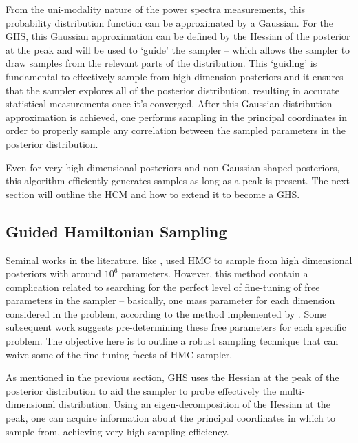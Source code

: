 \qquad From the uni-modality nature of the power spectra measurements, this probability distribution function can be approximated by a Gaussian. For the GHS, this Gaussian approximation can be defined by the Hessian of the posterior at the peak and will be used to `guide' the sampler -- which allows the sampler to draw samples from the relevant parts of the distribution. This `guiding' is fundamental to effectively sample from high dimension posteriors and it ensures that the sampler explores all of the posterior distribution, resulting in accurate statistical measurements once it's converged. After this Gaussian distribution approximation is achieved, one performs sampling in the principal coordinates in order to properly sample any correlation between the sampled parameters in the posterior distribution. 

\qquad Even for very high dimensional posteriors and non-Gaussian shaped posteriors, this algorithm efficiently generates samples as long as a peak is present. The next section will outline the HCM and how to extend it to become a GHS.

\subsection{Guided Hamiltonian Sampling}\label{Sec:BPL:GHS}
Seminal works in the literature, like \cite{Hanson2001,Taylor2008}, used HMC to sample from high dimensional posteriors with around $10^6$ parameters. However, this method contain a complication related to searching for the perfect level of fine-tuning of free parameters in the sampler -- basically, one mass parameter for each dimension considered in the problem, according to the method implemented by \cite{Taylor2008}. Some subsequent work suggests pre-determining these free parameters for each specific problem. The objective here is to outline a robust sampling technique that can waive some of the fine-tuning facets of HMC sampler.

\qquad As mentioned in the previous section, GHS uses the Hessian at the peak of the posterior distribution to aid the sampler to probe effectively the multi-dimensional distribution. Using an eigen-decomposition of the Hessian at the peak, one can acquire information about the principal coordinates in which to sample from, achieving very high sampling efficiency.

